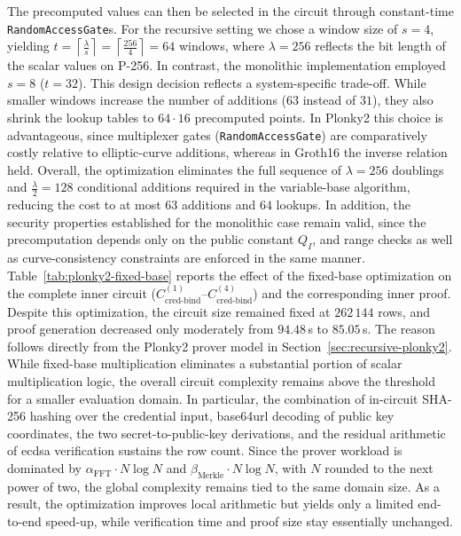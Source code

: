 The precomputed values can then be selected in the circuit through constant-time \texttt{RandomAccessGate}s. For the recursive setting we chose a window size of $s=4$, yielding $t = \left\lceil \tfrac{\lambda}{s} \right\rceil = \left\lceil \tfrac{256}{4} \right\rceil = 64$ windows, where $\lambda=256$ reflects the bit length of the scalar values on P-256. In contrast, the monolithic implementation employed $s=8$ ($t=32$). This design decision reflects a system-specific trade-off. While smaller windows increase the number of additions ($63$ instead of $31$), they also shrink the lookup tables to $64 \cdot 16$ precomputed points. In Plonky2 this choice is advantageous, since multiplexer gates (\texttt{RandomAccessGate}) are comparatively costly relative to elliptic-curve additions, whereas in Groth16 the inverse relation held. Overall, the optimization eliminates the full sequence of $\lambda = 256$ doublings and $\tfrac{\lambda}{2} = 128$ conditional additions required in the variable-base algorithm, reducing the cost to at most $63$ additions and $64$ lookups. In addition, the security properties established for the monolithic case remain valid, since the precomputation depends only on the public constant $Q_I$, and range checks as well as curve-consistency constraints are enforced in the same manner. Table~\ref{tab:plonky2-fixed-base} reports the effect of the fixed-base optimization on the complete inner circuit ($C_{\text{cred-bind}}^{(1)}$--$C_{\text{cred-bind}}^{(4)}$) and the corresponding inner proof. Despite this optimization, the circuit size remained fixed at $262\,144$ rows, and proof generation decreased only moderately from $94.48$\,s to $85.05$\,s. The reason follows directly from the Plonky2 prover model in Section~\ref{sec:recursive-plonky2}. While fixed-base multiplication eliminates a substantial portion of scalar multiplication logic, the overall circuit complexity remains above the threshold for a smaller evaluation domain. In particular, the combination of in-circuit SHA-256 hashing over the credential input, base64url decoding of public key coordinates, the two secret-to-public-key derivations, and the residual arithmetic of \acrshort{ecdsa} verification sustains the row count. Since the prover workload is dominated by $\alpha_{\text{FFT}} \cdot N\log N$ and $\beta_{\text{Merkle}} \cdot N\log N$, with $N$ rounded to the next power of two, the global complexity remains tied to the same domain size. As a result, the optimization improves local arithmetic but yields only a limited end-to-end speed-up, while verification time and proof size stay essentially unchanged.

